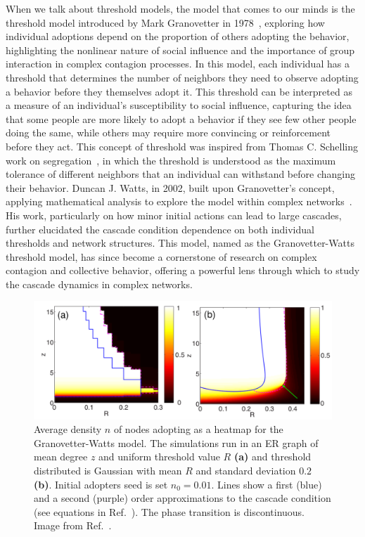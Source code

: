 When we talk about threshold models, the model that comes to our minds is the threshold model introduced by Mark Granovetter in 1978~\cite{granovetter-1978}, exploring how individual adoptions depend on the proportion of others adopting the behavior, highlighting the nonlinear nature of social influence and the importance of group interaction in complex contagion processes. In this model, each individual has a threshold that determines the number of neighbors they need to observe adopting a behavior before they themselves adopt it. This threshold can be interpreted as a measure of an individual's susceptibility to social influence, capturing the idea that some people are more likely to adopt a behavior if they see few other people doing the same, while others may require more convincing or reinforcement before they act. This concept of threshold was inspired from Thomas C. Schelling work on segregation~\cite{schelling-1969}, in which the threshold is understood as the maximum tolerance of different neighbors that an individual can withstand before changing their behavior. Duncan J. Watts, in 2002, built upon Granovetter's concept, applying mathematical analysis to explore the model within complex networks~\cite{watts-2002}. His work, particularly on how minor initial actions can lead to large cascades, further elucidated the cascade condition dependence on both individual thresholds and network structures. This model, named as the Granovetter-Watts threshold model, has since become a cornerstone of research on complex contagion and collective behavior, offering a powerful lens through which to study the cascade dynamics in complex networks.

\begin{figure}
    \centering
    \captionsetup{font=sf}
    \includegraphics[width=\textwidth]{Figs/Introduction/cascade_gleeson.pdf}
    \caption[Cascade diagram of the Granovetter-Watts model]{Average density $n$ of nodes adopting as a heatmap for the Granovetter-Watts model. The simulations run in an ER graph of mean degree $z$ and uniform threshold value $R$  \textbf{(a)} and threshold distributed is Gaussian with mean $R$ and standard deviation $0.2$ \textbf{(b)}. Initial adopters seed is set $n_0 = 0.01$. Lines show a first (blue) and a second (purple) order approximations to the cascade condition (see equations in Ref.~\cite{gleeson-2007}). The phase transition is discontinuous. Image from Ref.~\cite{gleeson-2007}.}
    \label{fig:Cascade_gleeson}
\end{figure}

